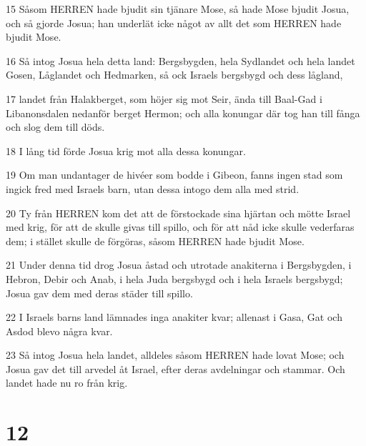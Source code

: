 \par 15 Såsom HERREN hade bjudit sin tjänare Mose, så hade Mose bjudit Josua, och så gjorde Josua; han underlät icke något av allt det som HERREN hade bjudit Mose.
\par 16 Så intog Josua hela detta land: Bergsbygden, hela Sydlandet och hela landet Gosen, Låglandet och Hedmarken, så ock Israels bergsbygd och dess lågland,
\par 17 landet från Halakberget, som höjer sig mot Seir, ända till Baal-Gad i Libanonsdalen nedanför berget Hermon; och alla konungar där tog han till fånga och slog dem till döds.
\par 18 I lång tid förde Josua krig mot alla dessa konungar.
\par 19 Om man undantager de hivéer som bodde i Gibeon, fanns ingen stad som ingick fred med Israels barn, utan dessa intogo dem alla med strid.
\par 20 Ty från HERREN kom det att de förstockade sina hjärtan och mötte Israel med krig, för att de skulle givas till spillo, och för att nåd icke skulle vederfaras dem; i stället skulle de förgöras, såsom HERREN hade bjudit Mose.
\par 21 Under denna tid drog Josua åstad och utrotade anakiterna i Bergsbygden, i Hebron, Debir och Anab, i hela Juda bergsbygd och i hela Israels bergsbygd; Josua gav dem med deras städer till spillo.
\par 22 I Israels barns land lämnades inga anakiter kvar; allenast i Gasa, Gat och Asdod blevo några kvar.
\par 23 Så intog Josua hela landet, alldeles såsom HERREN hade lovat Mose; och Josua gav det till arvedel åt Israel, efter deras avdelningar och stammar. Och landet hade nu ro från krig.

\chapter{12}

